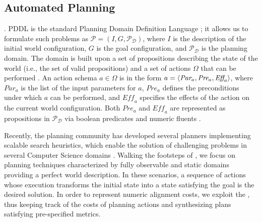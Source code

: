 
\subsection{Automated Planning}\label{ssec:ap}
 \cite{APlan}. PDDL is the standard Planning Domain Definition Language \cite{fox2003}; it allows us to formulate such problems as $\mathcal{P}=(I,G,\mathcal{P}_\mathcal{D})$, where $I$ is the description of the initial world configuration, $G$ is the goal configuration, and $\mathcal{P}_\mathcal{D}$ is the planning domain. The domain is built upon a set of propositions describing the state of the world (i.e., the set of valid propositions) and a set of actions $\Omega$ that can be performed . An action schema $a\in \Omega$ is in the form $a=\Braket{\textit{Par}_a,\textit{Pre}_a,\textit{Eff}_a}$, where $\textit{Par}_a$ is the list of the input parameters for $a$, $\textit{Pre}_a$ defines the preconditions under which $a$ can be performed, and $\textit{Eff}_a$ specifies the effects of the action on the current world configuration. Both $\textit{Pre}_a$ and $\textit{Eff}_a$ are represented as propositions in $\mathcal{P}_\mathcal{D}$ via boolean predicates and numeric fluents .

Recently, the planning community has developed several planners implementing scalable search heuristics, which enable the solution of challenging problems in several Computer Science domains \cite{Marrella17}. Walking  the footsteps of \cite{XuLZ17a}, we focus on planning techniques characterized by fully observable and static domains providing a perfect world description. In these scenarios, a sequence of actions whose execution transforms the initial state into a state satisfying the goal is the desired solution. In order to represent numeric alignment costs, we exploit the , thus keeping track of the costs of planning actions and synthesizing plans satisfying pre-specified metrics.

